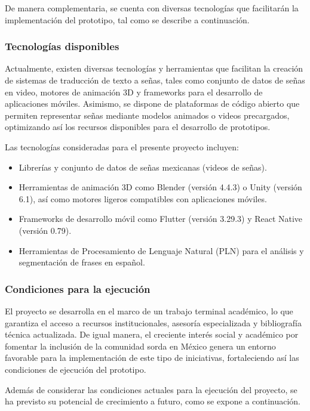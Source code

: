 De manera complementaria, se cuenta con diversas tecnologías que facilitarán la implementación del prototipo, tal como se describe a continuación.

\subsubsection{Tecnologías disponibles}
Actualmente, existen diversas tecnologías y herramientas que facilitan la creación de sistemas de traducción de texto a señas, tales como conjunto de datos de señas en video, motores de animación 3D y frameworks para el desarrollo de aplicaciones móviles. Asimismo, se dispone de plataformas de código abierto que permiten representar señas mediante modelos animados o videos precargados, optimizando así los recursos disponibles para el desarrollo de prototipos.

Las tecnologías consideradas para el presente proyecto incluyen:
\begin{itemize} 
	\item Librerías y conjunto de datos de señas mexicanas (videos de señas). 
	\item Herramientas de animación 3D como Blender (versión 4.4.3) o Unity (versión 6.1), así como motores ligeros compatibles con aplicaciones móviles. 
	\item Frameworks de desarrollo móvil como Flutter (versión 3.29.3) y React Native (versión 0.79). 
	\item Herramientas de Procesamiento de Lenguaje Natural (PLN) para el análisis y segmentación de frases en español. 
\end{itemize}

\subsubsection{Condiciones para la ejecución}
El proyecto se desarrolla en el marco de un trabajo terminal académico, lo que garantiza el acceso a recursos institucionales, asesoría especializada y bibliografía técnica actualizada. De igual manera, el creciente interés social y académico por fomentar la inclusión de la comunidad sorda en México genera un entorno favorable para la implementación de este tipo de iniciativas, fortaleciendo así las condiciones de ejecución del prototipo.

Además de considerar las condiciones actuales para la ejecución del proyecto, se ha previsto su potencial de crecimiento a futuro, como se expone a continuación.

